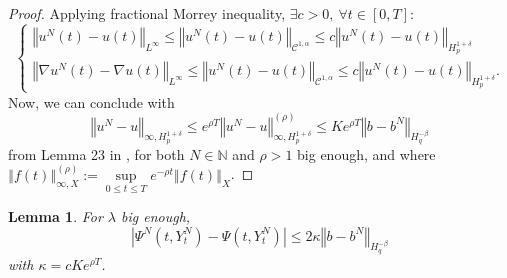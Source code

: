 \documentclass[11pt]{article}
\newtheorem{lem}[theo]{Lemma}
\newcommand{\norme}[1]{\left\Vert #1\right\Vert}
\newcommand{\N}{\mathbb{N}}
\begin{document}
    \begin{proof}
        Applying fractional Morrey inequality, $\exists c>0,\ \forall t\in[0,T]$:
        \begin{equation*}
        \begin{cases}
        \norme{u^N(t) - u(t)}_{L^\infty}\leq\norme{u^N(t) - u(t)}_{\mathcal{C}^{1,\alpha}}\leq c\norme{u^N(t)-u(t)}_{H^{1+\delta}_{p}}\\        
        \norme{\nabla u^N(t) - \nabla u(t)}_{L^\infty}\leq\norme{u^N(t) - u(t)}_{\mathcal{C}^{1,\alpha}}\leq c\norme{u^N(t)-u(t)}_{H^{1+\delta}_{p}}.
        \end{cases}        
        \end{equation*}        
        Now, we can conclude with
        \begin{equation*}
        \norme{u^N-u}_{\infty,H^{1+\delta}_{p}}\leq e^{\rho T} \norme{u^N-u}_{\infty,H^{1+\delta}_{p}}^{(\rho)}\leq Ke^{\rho T}\norme{b-b^N}_{H^{-\beta}_{q}}
        \end{equation*} from Lemma 23 in \cite{Fla-Iss-Rus-2017}, for both $N\in\N$ and $\rho>1$ big enough, and where $\norme{f(t)}_{\infty,X}^{(\rho)} := \underset{0\leq t\leq T}{\sup} e^{-\rho t} \norme{f(t)}_X$.
    \end{proof}
\begin{lem}\label{psi}
    For $\lambda$ big enough, \begin{equation*}
    \left|\Psi^N\left(t,Y_t^N\right)-\Psi\left(t,Y_t^N\right)\right|\leq 2\kappa \norme{b-b^N}_{H^{-\beta}_q}
    \end{equation*} 
    with $\kappa = c Ke^{\rho T}$.
\end{lem}
\end{document}
